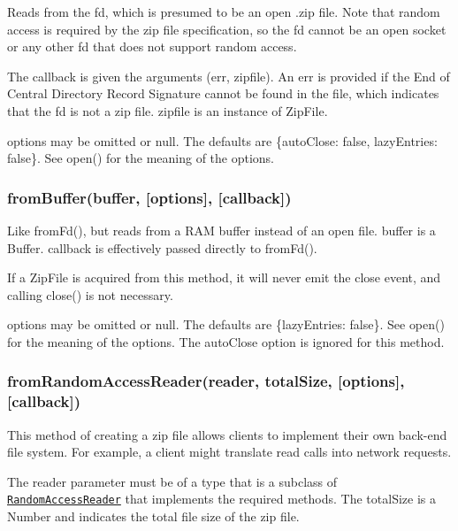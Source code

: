 Reads from the fd, which is presumed to be an open .zip file. Note that random access is required by the zip file specification, so the fd cannot be an open socket or any other fd that does not support random access.

The {\ttfamily callback} is given the arguments {\ttfamily (err, zipfile)}. An {\ttfamily err} is provided if the End of Central Directory Record Signature cannot be found in the file, which indicates that the fd is not a zip file. {\ttfamily zipfile} is an instance of {\ttfamily Zip\+File}.

{\ttfamily options} may be omitted or {\ttfamily null}. The defaults are {\ttfamily \{auto\+Close\+: false, lazy\+Entries\+: false\}}. See {\ttfamily open()} for the meaning of the options.

\subsubsection*{from\+Buffer(buffer, \mbox{[}options\mbox{]}, \mbox{[}callback\mbox{]})}

Like {\ttfamily from\+Fd()}, but reads from a R\+AM buffer instead of an open file. {\ttfamily buffer} is a {\ttfamily Buffer}. {\ttfamily callback} is effectively passed directly to {\ttfamily from\+Fd()}.

If a {\ttfamily Zip\+File} is acquired from this method, it will never emit the {\ttfamily close} event, and calling {\ttfamily close()} is not necessary.

{\ttfamily options} may be omitted or {\ttfamily null}. The defaults are {\ttfamily \{lazy\+Entries\+: false\}}. See {\ttfamily open()} for the meaning of the options. The {\ttfamily auto\+Close} option is ignored for this method.

\subsubsection*{from\+Random\+Access\+Reader(reader, total\+Size, \mbox{[}options\mbox{]}, \mbox{[}callback\mbox{]})}

This method of creating a zip file allows clients to implement their own back-\/end file system. For example, a client might translate read calls into network requests.

The {\ttfamily reader} parameter must be of a type that is a subclass of \href{#class-randomaccessreader}{\tt Random\+Access\+Reader} that implements the required methods. The {\ttfamily total\+Size} is a Number and indicates the total file size of the zip file.

